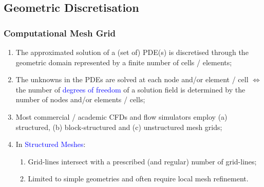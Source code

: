 \documentclass[10pt,compress]{beamer}
\begin{document}
\subsection{Geometric Discretisation}

\begin{frame}
 \frametitle{Computational Mesh Grid} 
 \begin{enumerate}
   \item <1-> The approximated solution of a (set of) PDE(s) is discretised through the geometric domain represented by a finite number of cells / elements;
   \item <2-> The unknowns in the PDEs are solved at each node and/or element / cell $\Longleftrightarrow$ the number of \textcolor{blue}{degrees of freedom} of a solution field is determined by the number of nodes and/or elements / cells;
   \item <3-> Most commercial / academic CFDs and flow simulators employ (a) structured, (b) block-structured and (c) unstructured mesh grids; 
    \item <4-> In \textcolor{blue}{Structured Meshes}:
    \begin{enumerate}
       \item <5-> Grid-lines intersect with a prescribed (and regular) number of grid-lines; 
       \item <6-> Limited to simple geometries and often require local mesh refinement.
    \end{enumerate}  
 \end{enumerate}  

\end{frame}
\end{document}
